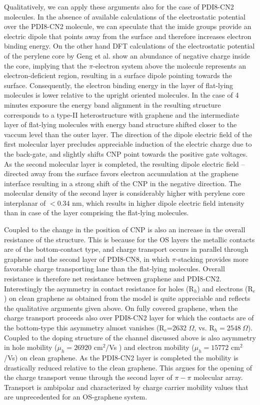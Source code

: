 \documentclass[preprint,aip,jap]{revtex4-2}
\begin{document}
Qualitatively, we can apply these arguments also for the case of PDI8-CN2 molecules. In the absence of available calculations of the electrostatic potential over the PDI8-CN2 molecule, we can speculate that the imide groups provide an electric dipole that points away from the surface and therefore increases electron binding energy. On the other hand DFT calculations of the electrostatic potential of the perylene core by Geng et al.\cite{geng-2012} show an abundance of negative charge inside the core, implying  that the $\pi$-electron system above the molecule represents an electron-deficient region, resulting in a surface dipole pointing towards the surface. Consequently, the electron binding energy in the layer of flat-lying molecules is lower relative to the upright oriented molecules.  In the case of 4 minutes exposure the energy band alignment in the resulting structure corresponds to a type-II heterostructure with graphene and the intermediate layer of flat-lying molecules with energy band structure shifted closer to the vaccum level than the outer layer.  The direction of the dipole electric field of the first molecular layer precludes appreciable induction of the electric charge due to the back-gate, and slightly shifts CNP point towards the positive gate voltages. As the second molecular layer is completed, the resulting dipole electric field -- directed away from the surface favors electron accumulation at the graphene interface resulting in a strong shift of the CNP in the negative direction.  The molecular density of the second layer is considerably higher with perylene core interplanar of $< 0.34$ nm, which results in higher dipole electric field intensity than in  case of the layer comprising the flat-lying molecules.

Coupled to the change in the position of CNP is also an increase in the overall resistance of the structure. This is because for the OS layers the metallic contacts are of the  bottom-contact type, and charge transport occurs in parallel through graphene and the second layer of PDI8-CN8, in which $\pi$-stacking provides more favorable charge transporting lane than the flat-lying molecules. Overall resistance is therefore net resistance between graphene and PDI8-CN2. Interestingly the asymmetry in contact resistance for holes (R$_{h}$) and  electrons  (R$_{e}$) on clean graphene as obtained from the model is quite appreciable and reflects the qualitative arguments given above.  On fully covered graphene, when the charge transport proceeds also over PDI8-CN2 layer for which the contacts are of the bottom-type this asymmetry almost vanishes (R$_{e}$=2632 $\Omega$, vs. R$_{h}=2548\ \Omega$).  Coupled to the doping structure of the channel discussed above is also asymmetry in hole mobility  ($\mu_{h}= 26920$ cm$^{2}$/Vs ) and electron mobility ($\mu_{h}= 15772$ cm$^{2}$/Vs) on clean graphene. As the PDI8-CN2 layer is completed the mobility is drastically reduced relative to the clean graphene.  This argues for the opening of the charge transport venue through the second layer of $\pi-\pi$ molecular array. Transport is ambipolar and characterized by charge carrier mobility values that are unprecedented for an OS-graphene system.  
\end{document}
